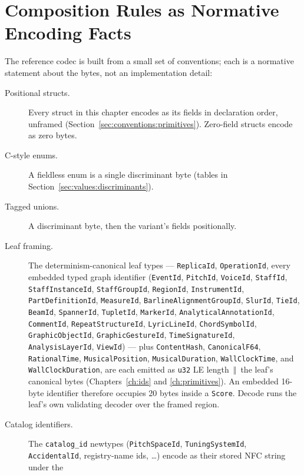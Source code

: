 \documentclass[11pt,letterpaper]{report}
\newcommand{\cat}{\ensuremath{\,\Vert\,}}
\begin{document}
\section{Composition Rules as Normative Encoding Facts}
\label{sec:values:composition}

The reference codec is built from a small set of conventions; each is a
normative statement about the bytes, not an implementation detail:

\begin{description}
  \item[Positional structs.] Every struct in this chapter encodes as its
    fields in declaration order, unframed
    (Section~\ref{sec:conventions:primitives}). Zero-field structs encode as
    zero bytes.
  \item[C-style enums.] A fieldless enum is a single discriminant byte
    (tables in Section~\ref{sec:values:discriminants}).
  \item[Tagged unions.] A discriminant byte, then the variant's fields
    positionally.
  \item[Leaf framing.] The determinism-canonical leaf types ---
    \texttt{ReplicaId}, \texttt{OperationId}, every embedded typed graph
    identifier (\texttt{EventId}, \texttt{PitchId}, \texttt{VoiceId},
    \texttt{StaffId}, \texttt{StaffInstanceId}, \texttt{StaffGroupId},
    \texttt{RegionId}, \texttt{InstrumentId}, \texttt{PartDefinitionId},
    \texttt{MeasureId}, \texttt{BarlineAlignmentGroupId}, \texttt{SlurId},
    \texttt{TieId}, \texttt{BeamId}, \texttt{SpannerId}, \texttt{TupletId},
    \texttt{MarkerId}, \texttt{AnalyticalAnnotationId}, \texttt{CommentId},
    \texttt{RepeatStructureId}, \texttt{LyricLineId}, \texttt{ChordSymbolId},
    \texttt{GraphicObjectId}, \texttt{GraphicGestureId},
    \texttt{TimeSignatureId}, \texttt{AnalysisLayerId}, \texttt{ViewId}) ---
    plus \texttt{ContentHash}, \texttt{CanonicalF64}, \texttt{RationalTime},
    \texttt{MusicalPosition}, \texttt{MusicalDuration},
    \texttt{WallClockTime}, and \texttt{WallClockDuration}, are each emitted
    as \texttt{u32} LE length \cat{} the leaf's canonical bytes
    (Chapters~\ref{ch:ids} and \ref{ch:primitives}). An embedded 16-byte
    identifier therefore occupies 20 bytes inside a \texttt{Score}. Decode
    runs the leaf's own validating decoder over the framed region.
  \item[Catalog identifiers.] The \texttt{catalog\_id} newtypes
    (\texttt{PitchSpaceId}, \texttt{TuningSystemId}, \texttt{AccidentalId},
    registry-name ids, \ldots) encode as their stored NFC string under the

\end{description}
\end{document}
